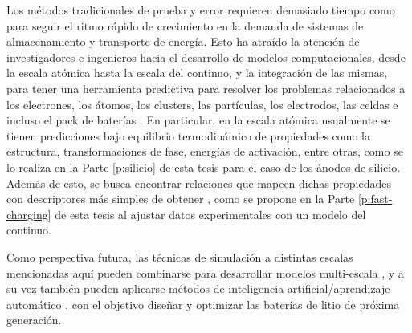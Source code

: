Los métodos tradicionales de prueba y error requieren demasiado tiempo como 
para seguir el ritmo rápido de crecimiento en la demanda de sistemas de 
almacenamiento y transporte de energía. %
Esto ha atraído la atención de investigadores e ingenieros 
hacia el desarrollo de modelos computacionales, desde la escala atómica hasta la 
escala del continuo, y la integración de las mismas, para tener una herramienta 
predictiva para resolver los problemas relacionados a los electrones, los átomos, 
los clusters, las partículas, los electrodos, las celdas e incluso el pack de 
baterías \cite{shi2016}. En particular, en la escala atómica usualmente se tienen
predicciones bajo equilibrio termodinámico de propiedades como la estructura, 
transformaciones de fase, energías de activación, entre otras, como se lo realiza
en la Parte \ref{p:silicio} de esta tesis para el caso de los ánodos de silicio. 
Además de esto, se busca encontrar relaciones que mapeen dichas propiedades con 
descriptores más simples de obtener \cite{juan2021}, como se propone en la Parte
\ref{p:fast-charging} de esta tesis al ajustar datos experimentales con un modelo
del continuo.

Como perspectiva futura, las técnicas de simulación a distintas escalas 
mencionadas aquí pueden combinarse para desarrollar modelos multi-escala 
\cite{franco2019}, y a su vez también pueden aplicarse métodos de inteligencia 
artificial/aprendizaje automático \cite{lombardo2021}, con el objetivo diseñar y 
optimizar las baterías de litio de próxima generación. 
